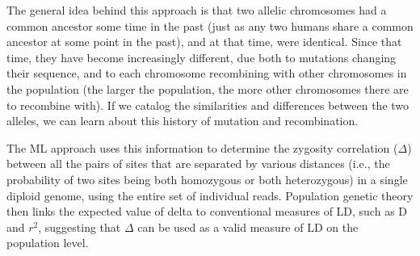 \documentclass{sig-alternate}
\begin{document}
The general idea behind this approach is that two allelic chromosomes had a common ancestor some time in the
past (just as any two humans share a common ancestor at some point in the past), and at that time, were
identical. Since that time, they have become increasingly different, due both to mutations changing their
sequence, and to each chromosome recombining with other chromosomes in the population (the larger the
population, the more other chromosomes there are to recombine with). If we catalog the similarities and
differences between the two alleles, we can learn about this history of mutation and recombination.

The ML approach uses this information to determine the zygosity correlation ($\Delta$) between all the pairs
of sites that are separated by various distances (i.e., the probability of two sites being both homozygous or
both heterozygous) in a single diploid genome, using the entire set of individual reads. Population genetic
theory then links the expected value of delta to conventional measures of LD, such as D and $r^2$, suggesting
that $\Delta$ can be used as a valid measure of LD on the population level.








\end{document}
